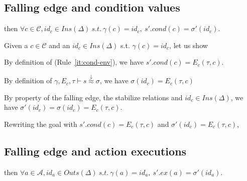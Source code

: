 \documentclass[dvipsnames,12pt]{article}
\begin{document}
\begin{niproof}
\begin{enumerate}
\begin{enumerate}
\begin{enumerate}
\begin{enumerate}
\begin{itemize}
              
            \end{itemize}
            
          \end{enumerate}
          
        \end{enumerate}
        
      \end{enumerate}
    \end{enumerate}
\end{niproof}

\subsection{Falling edge and condition values}
\label{sec:fe-cond-values}

\begin{lemma}
  \label{lem:fe-equal-cond-values}
  \fehyps{} then
  $\forall{}c\in\mathcal{C},id_c\in{}Ins(\Delta)~s.t.~\gamma(c)=id_c,~s'.cond(c)=\sigma'(id_c)$.
\end{lemma}

\begin{niproof}
  Given a $c\in\mathcal{C}$ and an $id_c\in{}Ins(\Delta)$
  s.t. $\gamma(c)=id_c$, let us show

  By definition of \dwSitpn (Rule~\ref{it:cond-env}), we have
  $s'.cond(c)=E_c(\tau,c)$.

  \noindent{}By definition of
  $\gamma,E_c,\tau\vdash{}s\stackrel{\downarrow}{\approx}\sigma$, we
  have $\sigma(id_c)=E_c(\tau,c)$
  
  By property of the \hvhdl{} falling edge, the stabilize relations
  and $id_c\in{}Ins(\Delta)$, we have
  $\sigma'(id_c)=\sigma(id_c)=E_c(\tau,c)$.

  \noindent{}Rewriting the goal with $s'.cond(c)=E_c(\tau,c)$ and
  $\sigma'(id_c)=E_c(\tau,c)$, 
  
\end{niproof}

\subsection{Falling edge and action executions}
\label{sec:fe-equal-act-exec}

\begin{lemma}
  \label{lem:fe-equal-act-exec}
  \fehyps{} then
  $\forall{}a\in\mathcal{A},id_a\in{}Outs(\Delta)~s.t.~\gamma(a)=id_a,~s'.ex(a)=\sigma'(id_a)$.
\end{lemma}
\end{document}
